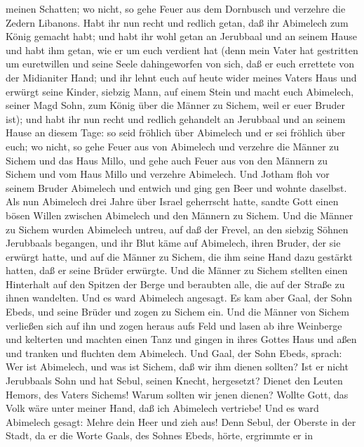 meinen Schatten; wo nicht, so gehe Feuer aus dem Dornbusch und verzehre
die Zedern Libanons.  Habt ihr nun recht und redlich getan,
daß ihr Abimelech zum König gemacht habt; und habt ihr wohl getan an
Jerubbaal und an seinem Hause und habt ihm getan, wie er um euch
verdient hat  (denn mein Vater hat gestritten um
euretwillen und seine Seele dahingeworfen von sich, daß er euch
errettete von der Midianiter Hand;  und ihr lehnt euch auf
heute wider meines Vaters Haus und erwürgt seine Kinder, siebzig Mann,
auf einem Stein und macht euch Abimelech, seiner Magd Sohn, zum König
über die Männer zu Sichem, weil er euer Bruder ist);  und
habt ihr nun recht und redlich gehandelt an Jerubbaal und an seinem
Hause an diesem Tage: so seid fröhlich über Abimelech und er sei
fröhlich über euch;  wo nicht, so gehe Feuer aus von
Abimelech und verzehre die Männer zu Sichem und das Haus Millo, und gehe
auch Feuer aus von den Männern zu Sichem und vom Haus Millo und verzehre
Abimelech.  Und Jotham floh vor seinem Bruder Abimelech und
entwich und ging gen Beer und wohnte daselbst.  Als nun
Abimelech drei Jahre über Israel geherrscht hatte,  sandte
Gott einen bösen Willen zwischen Abimelech und den Männern zu Sichem.
Und die Männer zu Sichem wurden Abimelech untreu,  auf daß
der Frevel, an den siebzig Söhnen Jerubbaals begangen, und ihr Blut käme
auf Abimelech, ihren Bruder, der sie erwürgt hatte, und auf die Männer
zu Sichem, die ihm seine Hand dazu gestärkt hatten, daß er seine Brüder
erwürgte.  Und die Männer zu Sichem stellten einen
Hinterhalt auf den Spitzen der Berge und beraubten alle, die auf der
Straße zu ihnen wandelten. Und es ward Abimelech angesagt. 
Es kam aber Gaal, der Sohn Ebeds, und seine Brüder und zogen zu Sichem
ein. Und die Männer von Sichem verließen sich auf ihn  und
zogen heraus aufs Feld und lasen ab ihre Weinberge und kelterten und
machten einen Tanz und gingen in ihres Gottes Haus und aßen und tranken
und fluchten dem Abimelech.  Und Gaal, der Sohn Ebeds,
sprach: Wer ist Abimelech, und was ist Sichem, daß wir ihm dienen
sollten? Ist er nicht Jerubbaals Sohn und hat Sebul, seinen Knecht,
hergesetzt? Dienet den Leuten Hemors, des Vaters Sichems! Warum sollten
wir jenen dienen?  Wollte Gott, das Volk wäre unter meiner
Hand, daß ich Abimelech vertriebe! Und es ward Abimelech gesagt: Mehre
dein Heer und zieh aus!  Denn Sebul, der Oberste in der
Stadt, da er die Worte Gaals, des Sohnes Ebeds, hörte, ergrimmte er in
